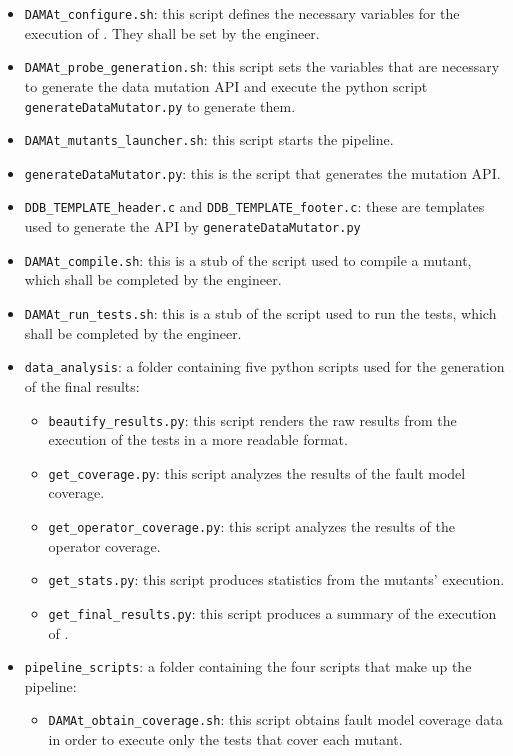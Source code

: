 \begin{itemize}
	\item \texttt{DAMAt\_configure.sh}: this script defines the necessary variables for the execution of \DAMA. They shall be set by the engineer.
	\item \texttt{DAMAt\_probe\_generation.sh}: this script sets the variables that are necessary to generate the data mutation API and execute the python script \texttt{generateDataMutator.py} to generate them.
	\item \texttt{DAMAt\_mutants\_launcher.sh}: this script starts the \DAMA pipeline.
	\item \texttt{generateDataMutator.py}: this is the script that generates the \DAMA mutation API.
	\item \texttt{DDB\_TEMPLATE\_header.c} and \texttt{DDB\_TEMPLATE\_footer.c}: these are templates used to generate the \DAMA API by \texttt{generateDataMutator.py}
	\item \texttt{DAMAt\_compile.sh}: this is a stub of the script used to compile a mutant, which shall be completed by the engineer.
	\item \texttt{DAMAt\_run\_tests.sh}: this is a stub of the script used to run the tests, which shall be completed by the engineer.
	\item \texttt{data\_analysis}: a folder containing five python scripts used for the generation of the final results:
	\begin{itemize}
	  \item \texttt{beautify\_results.py}: this script renders the raw results from the execution of the tests in a more readable format.
	  \item \texttt{get\_coverage.py}: this script analyzes the results of the fault model coverage.
	  \item \texttt{get\_operator\_coverage.py}: this script analyzes the results of the operator coverage.
	  \item \texttt{get\_stats.py}: this script produces statistics from the mutants' execution.
		\item \texttt{get\_final\_results.py}: this script produces a summary of the execution of \DAMA.
	\end{itemize}
	\item \texttt{pipeline\_scripts}: a folder containing the four scripts that make up the \DAMA pipeline:
	\begin{itemize}
		\item \texttt{DAMAt\_obtain\_coverage.sh}: this script obtains fault model coverage data in order to execute only the tests that cover each mutant.

\end{itemize}
\end{itemize}
